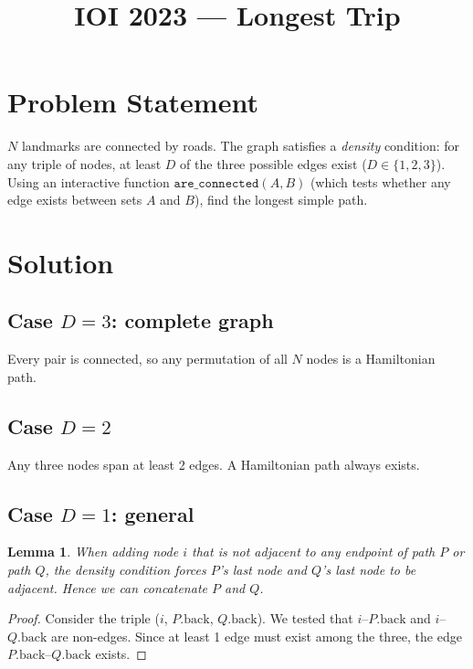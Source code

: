 \documentclass[11pt,a4paper]{article}
\title{IOI 2023 --- Longest Trip}
\author{}
\date{}
\newtheorem{lemma}[theorem]{Lemma}
\begin{document}
\maketitle

\section{Problem Statement}

$N$ landmarks are connected by roads.  The graph satisfies a
\emph{density} condition: for any triple of nodes, at least $D$ of
the three possible edges exist ($D \in \{1, 2, 3\}$).  Using an
interactive function $\texttt{are\_connected}(A, B)$ (which tests
whether any edge exists between sets $A$ and $B$), find the longest
simple path.

\section{Solution}

\subsection{Case $D = 3$: complete graph}

Every pair is connected, so any permutation of all $N$ nodes is a
Hamiltonian path.

\subsection{Case $D = 2$}

Any three nodes span at least 2 edges.  A Hamiltonian path always
exists.

\subsection{Case $D = 1$: general}

\begin{lemma}\label{lem:merge}
When adding node $i$ that is not adjacent to any endpoint of path $P$
or path $Q$, the density condition forces $P$'s last node and $Q$'s
last node to be adjacent.  Hence we can concatenate $P$ and $Q$.
\end{lemma}

\begin{proof}
Consider the triple ($i$, $P.\mathrm{back}$, $Q.\mathrm{back}$).  We
tested that $i$--$P.\mathrm{back}$ and $i$--$Q.\mathrm{back}$ are
non-edges.  Since at least 1 edge must exist among the three, the edge
$P.\mathrm{back}$--$Q.\mathrm{back}$ exists.
\end{proof}
\end{document}

